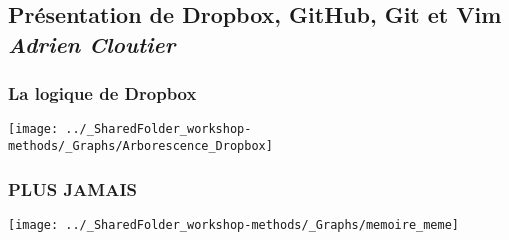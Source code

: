 \documentclass{beamer}
\begin{document}
% 
% 
% 
% 
% 
% 
% 
% 
% 
% 
% 

\subsection{Présentation de Dropbox, GitHub, Git et Vim \\ \small\emph{Adrien Cloutier}}

	
	  \begin{frame}
	        \frametitle{La logique de Dropbox} \vspace{1cm}   
	        \begin{center}
	           \texttt{[image: ../\_SharedFolder\_workshop-methods/\_Graphs/Arborescence\_Dropbox]}
	        \end{center}  
	    \end{frame}
	    
	
	  \begin{frame}
	        \frametitle{PLUS JAMAIS} \vspace{1cm}   
	        \begin{center}
	           \texttt{[image: ../\_SharedFolder\_workshop-methods/\_Graphs/memoire\_meme]}
	        \end{center}  
	    \end{frame}
	    
\end{document}
